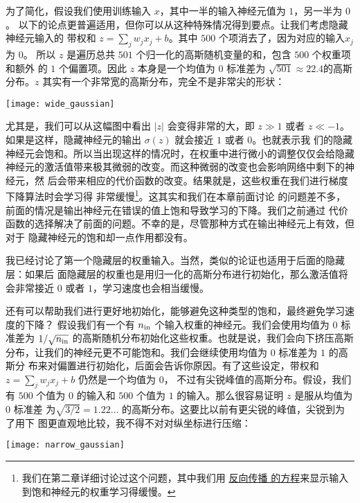 为了简化，假设我们使用训练输入 $x$，其中一半的输入神经元值为 $1$，另一半为 $0$。
以下的论点更普遍适用，但你可以从这种特殊情况得到要点。让我们考虑隐藏神经元输入的
带权和 $z=\sum_j w_j x_j + b$。其中 $500$ 个项消去了，因为对应的输入$x_j$ 为 $0$。
所以 $z$ 是遍历总共 $501$ 个归一化的高斯随机变量的和，包含 $500$ 个权重项和额外
的 $1$ 个偏置项。因此 $z$ 本身是一个均值为 $0$ 标准差为 $\sqrt{501} \approx
22.4$的高斯分布。$z$ 其实有一个非常宽的高斯分布，完全不是非常尖的形状：
\begin{center}
  \texttt{[image: wide\_gaussian]}
\end{center}

尤其是，我们可以从这幅图中看出 $|z|$ 会变得非常的大，即 $z \gg 1$ 或者 $z \ll
-1$。如果是这样，隐藏神经元的输出 $\sigma(z)$ 就会接近 $1$ 或者 $0$。也就表示我
们的隐藏神经元会饱和。所以当出现这样的情况时，在权重中进行微小的调整仅仅会给隐藏
神经元的激活值带来极其微弱的改变。而这种微弱的改变也会影响网络中剩下的神经元，然
后会带来相应的代价函数的改变。结果就是，这些权重在我们进行梯度下降算法时会学习得
非常缓慢\footnote{我们在第二章详细讨论过这个问题，其中我们用%
  \hyperref[sec:the_four_fundamental_equations_behind_backpropagation]{反向传播
    的方程}来显示输入到饱和神经元的权重学习得缓慢。}。这其实和我们在本章前面讨论
的问题差不多，前面的情况是输出神经元在错误的值上饱和导致学习的下降。我们之前通过
代价函数的选择解决了前面的问题。不幸的是，尽管那种方式在输出神经元上有效，但对于
隐藏神经元的饱和却一点作用都没有。

我已经讨论了第一个隐藏层的权重输入。当然，类似的论证也适用于后面的隐藏层：如果后
面隐藏层的权重也是用归一化的高斯分布进行初始化，那么激活值将会非常接近 $0$ 或者
$1$，学习速度也会相当缓慢。

还有可以帮助我们进行更好地初始化，能够避免这种类型的饱和，最终避免学习速度的下降？
假设我们有一个有 $n_{\rm in}$ 个输入权重的神经元。我们会使用均值为 $0$ 标准差为
$1/\sqrt{n_{\rm in}}$ 的高斯随机分布初始化这些权重。也就是说，我们会向下挤压高斯
分布，让我们的神经元更不可能饱和。我们会继续使用均值为 $0$ 标准差为 $1$ 的高斯分
布来对偏置进行初始化，后面会告诉你原因。有了这些设定，带权和 $z = \sum_j w_j x_j
+ b$ 仍然是一个均值为 $0$， 不过有尖锐峰值的高斯分布。假设，我们有 $500$ 个值为
$0$ 的输入和 $500$ 个值为 $1$ 的输入。那么很容易证明 $z$ 是服从均值为 $0$ 标准差
为$\sqrt{3/2} = 1.22\ldots$ 的高斯分布。这要比以前有更尖锐的峰值，尖锐到为了用下
图更直观地比较，我不得不对对纵坐标进行压缩：
\begin{center}
  \texttt{[image: narrow\_gaussian]}
\end{center}

